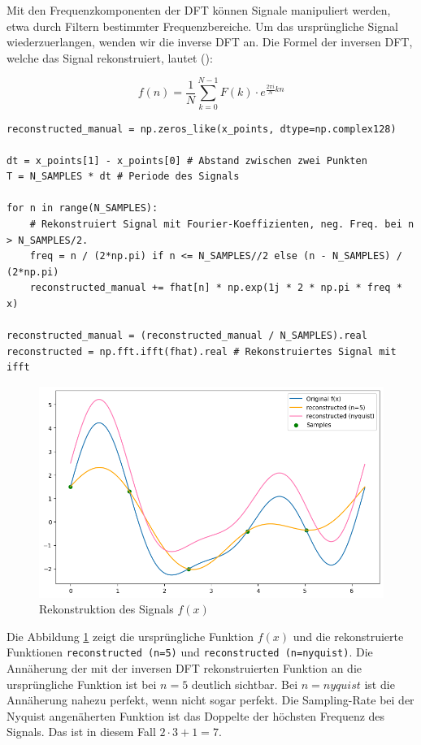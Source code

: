 \documentclass[11pt,a4paper]{article}
\begin{document}
\noindent
Mit den Frequenzkomponenten der DFT können Signale manipuliert werden, etwa durch Filtern
bestimmter Frequenzbereiche. Um das ursprüngliche Signal wiederzuerlangen, wenden wir die inverse
DFT an. Die Formel der inversen DFT, welche das Signal rekonstruiert, lautet
(\cite[Chapter~3]{hansen2014fourier}):


\[
	f(n) = \frac{1}{N} \sum_{k=0}^{N-1} F(k) \cdot e^{\frac{2\pi i}{N} kn}
\]

\begin{lstlisting}
reconstructed_manual = np.zeros_like(x_points, dtype=np.complex128)

dt = x_points[1] - x_points[0] # Abstand zwischen zwei Punkten
T = N_SAMPLES * dt # Periode des Signals

for n in range(N_SAMPLES):
    # Rekonstruiert Signal mit Fourier-Koeffizienten, neg. Freq. bei n > N_SAMPLES/2.
    freq = n / (2*np.pi) if n <= N_SAMPLES//2 else (n - N_SAMPLES) / (2*np.pi)
    reconstructed_manual += fhat[n] * np.exp(1j * 2 * np.pi * freq * x)

reconstructed_manual = (reconstructed_manual / N_SAMPLES).real
reconstructed = np.fft.ifft(fhat).real # Rekonstruiertes Signal mit ifft
\end{lstlisting}

\begin{figure}[h]
	\centering
	\includegraphics[width=0.60\linewidth]{img/dft_reconstructed.png}
	\caption{Rekonstruktion des Signals \(f(x)\)}
	\label{fig:dft_example_reconstructed}
\end{figure}

\noindent
\newline
Die Abbildung \ref{fig:dft_example_reconstructed} zeigt die ursprüngliche Funktion \(f(x)\) und die
rekonstruierte Funktionen \texttt{reconstructed (n=5)} und \texttt{reconstructed (n=nyquist)}.
Die Annäherung der mit der inversen DFT rekonstruierten Funktion an die ursprüngliche Funktion ist
bei \(n=5\) deutlich sichtbar. Bei \(n=nyquist\) ist die Annäherung nahezu perfekt, wenn nicht sogar
perfekt. Die Sampling-Rate bei der Nyquist angenäherten Funktion ist das Doppelte der höchsten
Frequenz des Signals. Das ist in diesem Fall \(2 \cdot 3 + 1 = 7\).
\end{document}
